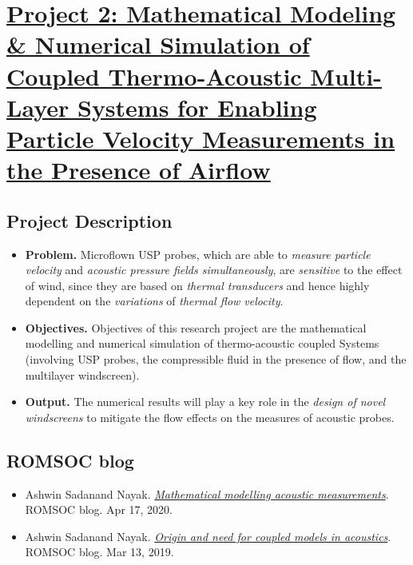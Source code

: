 \documentclass{book}
\numberwithin{equation}{section}
\begin{document}

\chapter{\href{https://www.romsoc.eu/mathematical-modelling-and-numerical-simulation-of-coupled-thermo-acoustic-multi-layer-systems-for-enabling-particle-velocity-measurements-in-the-presence-of-airflow/}{Project 2: Mathematical Modeling \& Numerical Simulation of Coupled Thermo-Acoustic Multi-Layer Systems for Enabling Particle Velocity Measurements in the Presence of Airflow}}

\section{Project Description}
\begin{itemize}
    \item \textbf{Problem.} Microflown USP probes, which are able to \textit{measure particle velocity} and \textit{acoustic pressure fields simultaneously}, are \textit{sensitive} to the effect of wind, since they are based on \textit{thermal transducers} and hence highly dependent on the \textit{variations} of \textit{thermal flow velocity}.
    \item \textbf{Objectives.} Objectives of this research project are the mathematical modelling and numerical simulation of thermo-acoustic coupled Systems (involving USP probes, the compressible fluid in the presence of flow, and the multilayer windscreen).
    \item \textbf{Output.} The numerical results will play a key role in the \textit{design of novel windscreens} to mitigate the flow effects on the measures of acoustic probes.
\end{itemize}

\section{ROMSOC blog}
\begin{itemize}
    \item Ashwin Sadanand Nayak. \href{https://www.romsoc.eu/mathematical-modelling-acoustic-measurements/}{\textit{Mathematical modelling acoustic measurements}}. ROMSOC blog. Apr 17, 2020.
    \item Ashwin Sadanand Nayak. \href{https://www.romsoc.eu/origin-and-need-for-coupled-models-in-acoustics/}{\textit{Origin and need for coupled models in acoustics}}. ROMSOC blog. Mar 13, 2019.
\end{itemize}
\end{document}
